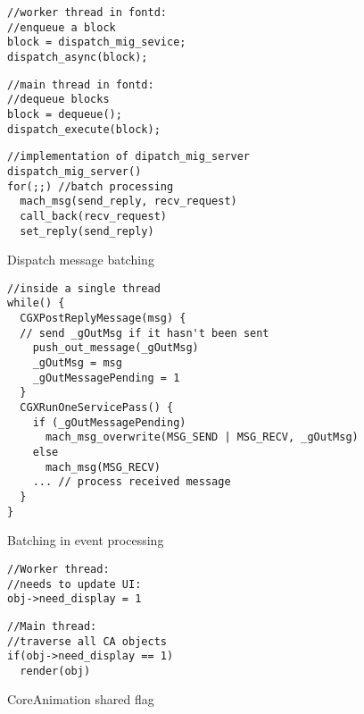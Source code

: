 \begin{figure}[t]
\begin{minipage}[t]{.25\textwidth}
\begin{lstlisting}
//worker thread in fontd:
//enqueue a block
block = dispatch_mig_sevice;
dispatch_async(block);
\end{lstlisting}
\end{minipage}\hfill
\begin{minipage}[t]{.21\textwidth}
\begin{lstlisting}
//main thread in fontd:
//dequeue blocks
block = dequeue();
dispatch_execute(block);
\end{lstlisting}
\end{minipage}

\begin{minipage}[t]{0.48\textwidth}
\begin{lstlisting}
//implementation of dipatch_mig_server
dispatch_mig_server()
for(;;) //batch processing
  mach_msg(send_reply, recv_request)
  call_back(recv_request)
  set_reply(send_reply)
\end{lstlisting}
\end{minipage}
\vspace{-0.3cm}
    \caption{Dispatch message batching}
    \label{fig:dispatchmessagebatching}
\end{figure}

\begin{figure}[t]
\begin{lstlisting}
//inside a single thread
while() {
  CGXPostReplyMessage(msg) {
  // send _gOutMsg if it hasn't been sent
    push_out_message(_gOutMsg)
    _gOutMsg = msg
    _gOutMessagePending = 1
  }
  CGXRunOneServicePass() {
    if (_gOutMessagePending)
      mach_msg_overwrite(MSG_SEND | MSG_RECV, _gOutMsg)
    else
      mach_msg(MSG_RECV)
    ... // process received message
  }
}
\end{lstlisting}
\vspace{-0.7cm}
    \caption{Batching in event processing}
    \label{fig:batchingineventprocessing}
\end{figure}

\begin{figure}[t!]
\begin{minipage}[t]{.20\textwidth}
\begin{lstlisting}
//Worker thread:
//needs to update UI:
obj->need_display = 1
\end{lstlisting}\hfill
\end{minipage}
\noindent\begin{minipage}[t]{.28\textwidth}
\begin{lstlisting}
//Main thread: 
//traverse all CA objects
if(obj->need_display == 1)
  render(obj)
\end{lstlisting}\hfill
\end{minipage}
\vspace{-0.7cm}
    \caption{CoreAnimation shared flag}
    \label{fig:casharedflag}
\end{figure}

